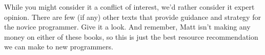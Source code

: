 While you might consider it a conflict of interest, we'd rather consider it expert opinion. There are few (if any) other texts that provide guidance and strategy for the novice programmer. Give it a look. And remember, Matt isn't making any money on either of these books, so this is just the best resource recommendation we can make to new programmers.


